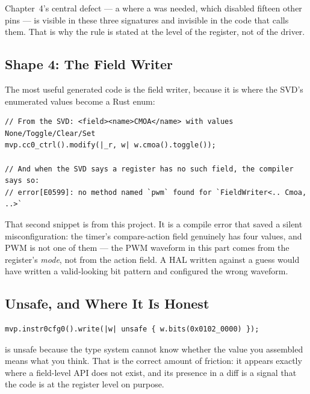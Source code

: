 Chapter~4's central defect — a  where a  was needed, which
disabled fifteen other pins — is visible in these three signatures and invisible in the code that
calls them. That is why the rule is stated at the level of the register, not of the driver.

\subsection{Shape 4: The Field Writer}

The most useful generated code is the field writer, because it is where the SVD's enumerated values
become a Rust enum:

\begin{verbatim}
// From the SVD: <field><name>CMOA</name> with values None/Toggle/Clear/Set
mvp.cc0_ctrl().modify(|_r, w| w.cmoa().toggle());

// And when the SVD says a register has no such field, the compiler says so:
// error[E0599]: no method named `pwm` found for `FieldWriter<.. Cmoa, ..>`
\end{verbatim}

That second snippet is from this project. It is a compile error that saved a silent misconfiguration:
the timer's compare-action field genuinely has four values, and PWM is not one of them — the PWM
waveform in this part comes from the register's \emph{mode}, not from the action field. A HAL written
against a guess would have written a valid-looking bit pattern and configured the wrong waveform.

\subsection{Unsafe, and Where It Is Honest}

\begin{verbatim}
mvp.instr0cfg0().write(|w| unsafe { w.bits(0x0102_0000) });
\end{verbatim}

 is unsafe because the type system cannot know whether the value you assembled
means what you think. That  is the correct amount of friction: it appears exactly
where a field-level API does not exist, and its presence in a diff is a signal that the code is at
the register level on purpose.
